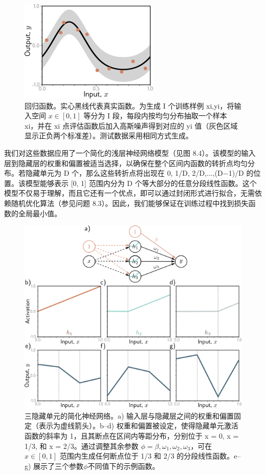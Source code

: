 \begin{figure}[ht!]
\centering
\includegraphics[width=0.7\linewidth]{png/chapter8/PerfDataSet.png}
\caption{回归函数。实心黑线代表真实函数。为生成 I 个训练样例 {xi,yi}，将输入空间 \(x \in [0,1]\) 等分为 I 段，每段内按均匀分布抽取一个样本 xi，并在 xi 点评估函数后加入高斯噪声得到对应的 yi 值（灰色区域显示正负两个标准差）。测试数据采用相同方式生成。}
\end{figure}


我们对这些数据应用了一个简化的浅层神经网络模型（见图 8.4）。该模型的输入层到隐藏层的权重和偏置被适当选择，以确保在整个区间内函数的转折点均匀分布。若隐藏单元为 D 个，那么这些转折点将出现在 0, 1/D, 2/D,...,(D−1)/D 的位置。该模型能够表示 [0, 1] 范围内分为 D 个等大部分的任意分段线性函数。这个模型不仅易于理解，而且它还有一个优点，即可以通过封闭形式进行拟合，无需依赖随机优化算法（参见问题 8.3）。因此，我们能够保证在训练过程中找到损失函数的全局最小值。

\begin{figure}[ht!]
\centering
\includegraphics[width=0.7\linewidth]{png/chapter8/PerfModel.png}
\caption{三隐藏单元的简化神经网络。a) 输入层与隐藏层之间的权重和偏置固定（表示为虚线箭头）。b–d) 权重和偏置被设定，使得隐藏单元激活函数的斜率为 1，且其断点在区间内等距分布，分别位于 x = 0, x = 1/3, 和 x = 2/3。通过调整其余参数 \(\phi = {\beta, \omega_1, \omega_2, \omega_3}\)，可在 \(x \in [0,1]\) 范围内生成任何断点位于 1/3 和 2/3 的分段线性函数。e–g) 展示了三个参数\(\phi\)不同值下的示例函数。}
\end{figure}

